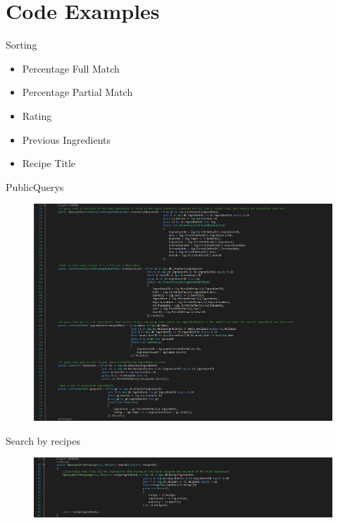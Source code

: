 \section{Code Examples}

\begin{frame}{Sorting}
    \begin{itemize}
        \item Percentage Full Match
        \item Percentage Partial Match
        \item Rating
        \item Previous Ingredients
        \item Recipe Title
    \end{itemize}
\end{frame}

\begin{frame}{PublicQuerys}
    \begin{figure}
        \centering
        \includegraphics[width=\textwidth]{Grafik/PublicQuerys}
    \end{figure}
\end{frame}

\begin{frame}{Search by recipes}
    \begin{figure}
        \centering
        \includegraphics[width=\textwidth]{Grafik/search}
    \end{figure}
\end{frame}

